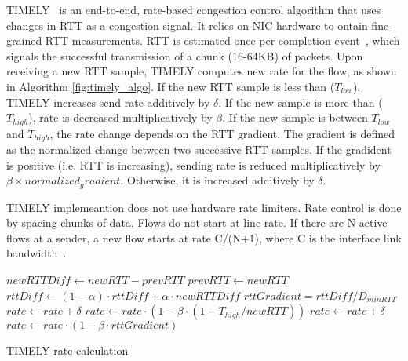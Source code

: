 TIMELY~\cite{timely} is an end-to-end, rate-based congestion control algorithm
that uses changes in RTT as a congestion signal.  It relies on NIC hardware to
ontain fine-grained RTT measurements. RTT is estimated once per completion
event~\cite{rocev2}, which signals the successful transmission of a chunk
(16-64KB) of packets. Upon receiving a new RTT sample, TIMELY computes new rate
for the flow, as shown in Algorithm \ref{fig:timely_algo}.  If the new RTT
sample is less than ($T_{low}$), TIMELY increases send rate additively by
$\delta$. If the new sample is more than ($T_{high}$), rate is decreased
multiplicatively by $\beta$. If the new sample is between $T_{low}$ and
$T_{high}$, the rate change depends on the RTT gradient. The gradient is defined
as the normalized change between two successive RTT samples. If the gradident is
positive (i.e. RTT is increasing), sending rate is reduced multiplicatively by
$\beta \times normalized_gradient$.  Otherwise, it is increased additively by
$\delta$.

TIMELY implemeantion does not use hardware rate limiters. Rate control is done
by spacing chunks of data. Flows do not start at line rate. If there are N
active flows at a sender, a new flow starts at rate C/(N+1), where C is the
interface link bandwidth~\cite{timely:private}.

\begin{algorithm}[t]
\footnotesize
{
\begin{algorithmic}[1]
\State $newRTTDiff \gets newRTT - prevRTT$
\State $prevRTT \gets newRTT$
\State $rttDiff \gets (1-\alpha) \cdot rttDiff + \alpha \cdot newRTTDiff$
\State $rttGradient = rttDiff/D_{minRTT}$
        \State $rate \gets rate + \delta$
        \State $rate \gets rate \cdot  (1 - \beta \cdot (1 - T_{high}/newRTT))$
        \State $rate \gets rate + \delta$
\Else
        \State $rate \gets rate \cdot (1 - \beta \cdot rttGradient)$
\EndIf 
\end{algorithmic}
}
\caption{TIMELY rate calculation}
\label{fig:timely_algo}
\end{algorithm}


